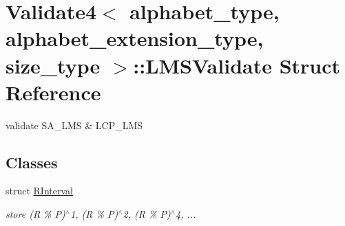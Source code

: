 \hypertarget{struct_validate4_1_1_l_m_s_validate}{}\section{Validate4$<$ alphabet\+\_\+type, alphabet\+\_\+extension\+\_\+type, size\+\_\+type $>$\+:\+:L\+M\+S\+Validate Struct Reference}
\label{struct_validate4_1_1_l_m_s_validate}


validate S\+A\+\_\+\+L\+MS \& L\+C\+P\+\_\+\+L\+MS  


\subsection*{Classes}
\begin{DoxyCompactItemize}
\item 
struct \hyperlink{struct_validate4_1_1_l_m_s_validate_1_1_r_interval}{R\+Interval}
\begin{DoxyCompactList}\small\item\em store (R \% P)$^\wedge$1, (R \% P)$^\wedge$2, (R \% P)$^\wedge$4, ... \end{DoxyCompactList}\end{DoxyCompactItemize}
